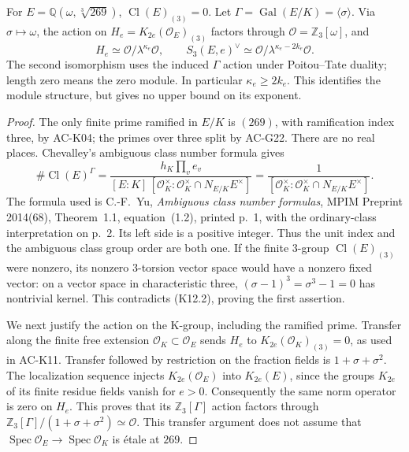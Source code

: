 \begin{proposition}
\label{AC-K12}
For $E=\mathbb Q(\omega,\sqrt[3]{269})$,
$\operatorname{Cl}(E)_{(3)}=0$.
Let $\Gamma=\operatorname{Gal}(E/K)=\langle\sigma\rangle$.
Via $\sigma\mapsto\omega$, the action on
$H_e=K_{2e}(\mathcal O_E)_{(3)}$ factors through
$\mathcal O=\mathbb Z_3[\omega]$, and
\[
 H_e\simeq\mathcal O/\lambda^{\kappa_e}\mathcal O,
 \qquad
 S_3(E,e)^\vee\simeq
       \mathcal O/\lambda^{\kappa_e-2k_e}\mathcal O.     \tag{K12.1}
\]
The second isomorphism uses the induced $\Gamma$ action under
Poitou--Tate duality; length zero means the zero module.
In particular $\kappa_e\geq2k_e$.
This identifies the module structure, but gives no upper bound
on its exponent.
\end{proposition}
\begin{proof}
The only finite prime ramified in $E/K$ is $(269)$, with
ramification index three, by AC-K04; the primes over three
split by AC-G22.  There are no real places.
Chevalley's ambiguous class number formula gives
\[
 \#\operatorname{Cl}(E)^\Gamma
 =\frac{h_K\prod_v e_v}
 {[E:K]\,[\mathcal O_K^\times:
                 \mathcal O_K^\times\cap N_{E/K}E^\times]}
 =\frac1{[\mathcal O_K^\times:
                 \mathcal O_K^\times\cap N_{E/K}E^\times]}.
                                                               \tag{K12.2}
\]
The formula used is C.-F.~Yu, \emph{Ambiguous class number
formulas}, MPIM Preprint 2014(68), Theorem~1.1, equation~(1.2),
printed p.~1, with the ordinary-class interpretation on p.~2.
Its left side is a positive integer.  Thus the unit index and
the ambiguous class group order are both one.  If the finite
$3$-group $\operatorname{Cl}(E)_{(3)}$ were nonzero, its
nonzero $3$-torsion vector space would have a nonzero fixed
vector: on a vector space in characteristic three,
$(\sigma-1)^3=\sigma^3-1=0$ has nontrivial kernel.
This contradicts (K12.2), proving the first assertion.

We next justify the action on the K-group, including the
ramified prime.  Transfer along the finite free extension
$\mathcal O_K\subset\mathcal O_E$ sends $H_e$ to
$K_{2e}(\mathcal O_K)_{(3)}=0$, as used in AC-K11.
Transfer followed by restriction on the fraction fields is
$1+\sigma+\sigma^2$.  The localization sequence injects
$K_{2e}(\mathcal O_E)$ into $K_{2e}(E)$, since the groups
$K_{2e}$ of its finite residue fields vanish for $e>0$.
Consequently the same norm operator is zero on $H_e$.
This proves that its $\mathbb Z_3[\Gamma]$ action factors
through $\mathbb Z_3[\Gamma]/(1+\sigma+\sigma^2)
\simeq\mathcal O$.  This transfer argument does not assume
that $\operatorname{Spec}\mathcal O_E\to\operatorname{Spec}\mathcal O_K$
is \'etale at $269$.


\end{proof}
